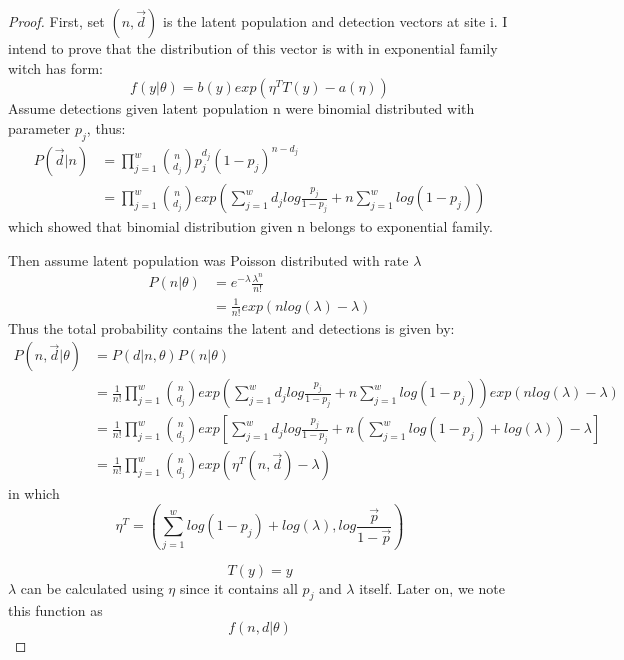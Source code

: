 \documentclass[]{article}
\begin{document}
\begin{proof}
First, set $(n,\vec{d})$ is the latent population and detection vectors at site i. I intend to prove that the distribution of this vector is with in exponential family witch has form:
\begin{equation}
	f(y|\theta)=b(y)exp(\eta^{T}T(y)-a(\eta))
\end{equation}
Assume detections given latent population n were binomial distributed with parameter $p_{j}$, thus:
\begin{equation}
	\begin{aligned}
		P(\vec{d}|n)&=\prod_{j=1}^{w}\binom{n}{d_{j}}p_{j}^{d_{j}}(1-p_{j})^{n-d_{j}}\\
		&=\prod_{j=1}^{w}\binom{n}{d_{j}}exp(\sum_{j=1}^{w}d_{j}log\frac{p_{j}}{1-p_{j}}+n\sum_{j=1}^{w}log(1-p_{j}))
	\end{aligned}
\end{equation}
which showed that binomial distribution given n belongs to exponential family.

Then assume latent population was Poisson distributed with rate $\lambda$
\begin{equation}
	\begin{aligned}
		P(n|\theta)&=e^{-\lambda}\frac{\lambda^{n}}{n!}\\
		&=\frac{1}{n!}exp(nlog(\lambda)-\lambda)
	\end{aligned}
\end{equation}
Thus the total probability contains the latent and detections is given by:
\begin{equation}
	\begin{aligned}
		P(n,\vec{d}|\theta)&=P(d|n,\theta)P(n|\theta)\\
		&=\frac{1}{n!}\prod_{j=1}^{w}\binom{n}{d_{j}}exp(\sum_{j=1}^{w}d_{j}log\frac{p_{j}}{1-p_{j}}+n\sum_{j=1}^{w}log(1-p_{j}))exp(nlog(\lambda)-\lambda)\\
		&=\frac{1}{n!}\prod_{j=1}^{w}\binom{n}{d_{j}}exp[\sum_{j=1}^{w}d_{j}log\frac{p_{j}}{1-p_{j}}+n(\sum_{j=1}^{w}log(1-p_{j})+log(\lambda))-\lambda]\\
		&=\frac{1}{n!}\prod_{j=1}^{w}\binom{n}{d_{j}}exp(\eta^{T}(n,\vec{d})-\lambda)
	\end{aligned}
\end{equation}
in which 
\[
\eta^{T}=(\sum_{j=1}^{w}log(1-p_{j})+log(\lambda),log\frac{\vec{p}}{1-\vec{p}})
\]

\[
T(y)=y
\]
$\lambda$ can be calculated using $\eta$ since it contains all $p_{j}$ and $\lambda$ itself.
Later on, we note this function as
\[
f(n,d|\theta)
\]
\end{proof}
\end{document}
